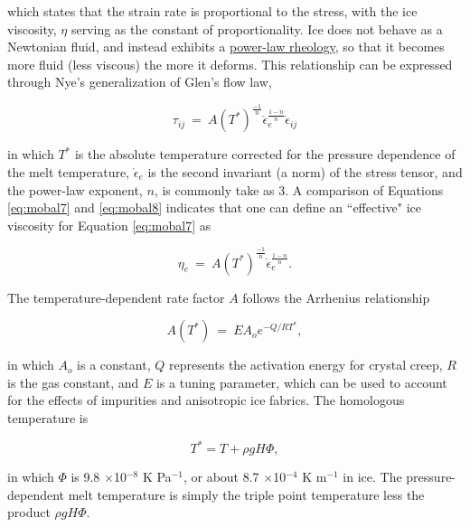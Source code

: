 which states that the strain rate is proportional to the stress, with the ice viscosity, $\eta$ serving as the constant of proportionality.
Ice does not behave as a Newtonian fluid, and instead exhibits a \href{http://en.wikipedia.org/wiki/Power-law_fluid}{power-law rheology}, 
so that it becomes more fluid (less viscous) the more it deforms. This relationship can be expressed through Nye's generalization of Glen's 
flow law, 

\begin{equation}
\tau_{ij}~=~A(T^{*})^{\frac{-1}{n}} \dot{\epsilon}_{e}^{\frac{1-n}{n}} \dot{\epsilon}_{ij} 
\label{eq:mobal8}
\end{equation}

in which $T^{*}$ is the absolute temperature corrected for the pressure dependence of the melt temperature, $\dot{\epsilon}_{e}$ is the 
second invariant (a norm) of the stress tensor, and the power-law exponent, $n$, is commonly take as 3. A comparison of Equations 
\eqref{eq:mobal7} and \eqref{eq:mobal8} indicates that one can define an ``effective" ice viscosity for Equation \eqref{eq:mobal7} as

\begin{equation}
\eta_{e}~=~A(T^{*})^{\frac{-1}{n}} \dot{\epsilon}_{e}^{\frac{1-n}{n}}.
\label{eq:mobal9}
\end{equation}

The temperature-dependent rate factor $A$ follows the Arrhenius relationship

\begin{equation}
A\left( T^{*}\right)~=~E A_{o}e^{-Q/RT^{*}},
\label{eq:mobal10}
\end{equation}

in which $A_{o}$ is a constant, $Q$ represents the activation energy for crystal creep, $R$ is the gas constant, and $E$ is a tuning 
parameter, which can be used to account for the effects of impurities and anisotropic ice fabrics. The homologous temperature is

\begin{equation}
T^{*}=T+\rho g H \Phi,
\label{eq:mobal11}
\end{equation}

in which $\Phi$ is 9.8 $\times$10$^{-8}$ K Pa$^{-1}$, or about 8.7 $\times$10$^{-4}$ K m$^{-1}$ in ice. The pressure-dependent melt 
temperature is simply the triple point temperature less the product $\rho g H \Phi$.
